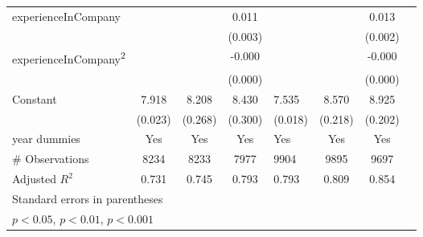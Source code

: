 \begin{longtable}{l*{3}{c}|l*{3}{c}}
		experienceInCompany &                     &                     &       0.011\sym{***}&                     &                     &       0.013\sym{***}\\
		&                     &                     &     (0.003)         &                     &                     &     (0.002)         \\
		experienceInCompany\textsuperscript{2}&                     &                     &      -0.000\sym{*}  &                     &                     &      -0.000\sym{***}\\
		&                     &                     &     (0.000)         &                     &                     &     (0.000)         \\
		Constant            &       7.918\sym{***}&       8.208\sym{***}&       8.430\sym{***}&       7.535\sym{***}&       8.570\sym{***}&       8.925\sym{***}\\
		&     (0.023)         &     (0.268)         &     (0.300)         &     (0.018)         &     (0.218)         &     (0.202)         \\
		year dummies        &         Yes         &         Yes         &         Yes         &         Yes         &         Yes         &         Yes         \\
		\midrule
	\#	Observations        &        8234         &        8233         &        7977         &        9904         &        9895         &        9697         \\
		Adjusted \(R^{2}\)  &       0.731         &       0.745         &       0.793         &       0.793         &       0.809         &       0.854         \\
		\bottomrule
		\multicolumn{7}{l}{\footnotesize Standard errors in parentheses}\\
		\multicolumn{7}{l}{\footnotesize \sym{*} \(p<0.05\),
          \sym{**} \(p<0.01\), \sym{***} \(p<0.001\)}
          \label{tab:ru_wage_full}
	\end{longtable}

